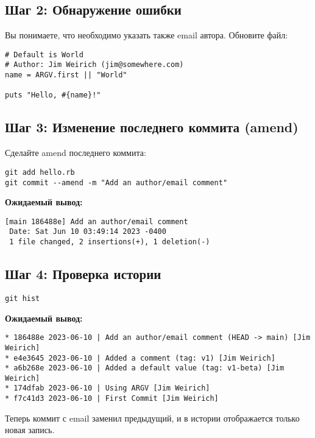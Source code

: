 \documentclass[a4paper,12pt]{report}
\begin{document}
\subsection*{Шаг 2: Обнаружение ошибки}

Вы понимаете, что необходимо указать также email автора. Обновите файл:
\begin{verbatim}
# Default is World
# Author: Jim Weirich (jim@somewhere.com)
name = ARGV.first || "World"

puts "Hello, #{name}!"
\end{verbatim}

\subsection*{Шаг 3: Изменение последнего коммита (amend)}

Сделайте amend последнего коммита:
\begin{verbatim}
git add hello.rb
git commit --amend -m "Add an author/email comment"
\end{verbatim}

\textbf{Ожидаемый вывод:}
\begin{verbatim}
[main 186488e] Add an author/email comment
 Date: Sat Jun 10 03:49:14 2023 -0400
 1 file changed, 2 insertions(+), 1 deletion(-)
\end{verbatim}

\subsection*{Шаг 4: Проверка истории}
\begin{verbatim}
git hist
\end{verbatim}

\textbf{Ожидаемый вывод:}
\begin{verbatim}
* 186488e 2023-06-10 | Add an author/email comment (HEAD -> main) [Jim Weirich]
* e4e3645 2023-06-10 | Added a comment (tag: v1) [Jim Weirich]
* a6b268e 2023-06-10 | Added a default value (tag: v1-beta) [Jim Weirich]
* 174dfab 2023-06-10 | Using ARGV [Jim Weirich]
* f7c41d3 2023-06-10 | First Commit [Jim Weirich]
\end{verbatim}

Теперь коммит с email заменил предыдущий, и в истории отображается только новая запись.

\end{document}
